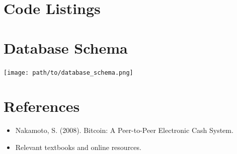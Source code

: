 \documentclass[12pt,a4paper]{report}
\begin{document}
\appendix
\chapter{Code Listings}
% 
% 

\chapter{Database Schema}
\texttt{[image: path/to/database\_schema.png]}

\chapter{References}
\begin{itemize}
    \item Nakamoto, S. (2008). Bitcoin: A Peer-to-Peer Electronic Cash System.
    \item Relevant textbooks and online resources.
\end{itemize}
\end{document}
